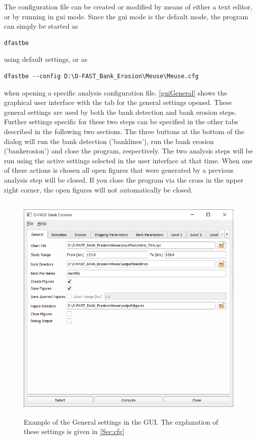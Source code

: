 The configuration file can be created or modified by means of either a text editor, or by \dfastbe running in gui mode.
Since the gui mode is the default mode, the program can simply be started as

\begin{Verbatim}
dfastbe
\end{Verbatim}

using default settings, or as

\begin{Verbatim}
dfastbe --config D:\D-FAST_Bank_Erosion\Meuse\Meuse.cfg
\end{Verbatim}

when opening a specific analysis configuration file.
\autoref{guiGeneral} shows the graphical user interface with the tab for the general settings opened.
These general settings are used by both the bank detection and bank erosion steps.
Further settings specific for these two steps can be specified in the other tabs described in the following two sections.
The three buttons at the bottom of the dialog will run the bank detection ('banklines'), run the bank erosion ('bankerosion') and close the program, respectively.
The two analysis steps will be run using the active settings selected in the user interface at that time.
When one of these actions is chosen all open figures that were generated by a previous analysis step will be closed.
If you close the program via the cross in the upper right corner, the open figures will not automatically be closed.

\begin{figure}[!ht]
	\vspace*{-0.6cm} 
	\center
	\includegraphics[width=\textwidth,height=11.4cm]{figures/gui1.png}
	\caption{Example of the General settings in the GUI. The explanation of these settings is given in \autoref{Sec:cfg}}
	\vspace*{-0.2cm} 
	\label{guiGeneral}
	\vspace*{-0.2cm} 
\end{figure}

